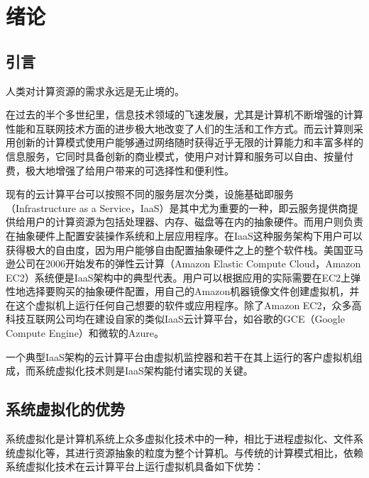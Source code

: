 
\chapter{绪论}
\label{chap:what}

\section{引言}

人类对计算资源的需求永远是无止境的。

在过去的半个多世纪里，信息技术领域的飞速发展，尤其是计算机不断增强的计算性能和互联网技术方面的进步极大地改变了人们的生活和工作方式。而云计算则采用创新的计算模式使用户能够通过网络随时获得近乎无限的计算能力和丰富多样的信息服务，它同时具备创新的商业模式，使用户对计算和服务可以自由、按量付费，极大地增强了给用户带来的可选择性和便利性。

现有的云计算平台可以按照不同的服务层次分类，设施基础即服务（Infrastructure as a Service，IaaS）是其中尤为重要的一种，即云服务提供商提供给用户的计算资源为包括处理器、内存、磁盘等在内的抽象硬件。而用户则负责在抽象硬件上配置安装操作系统和上层应用程序。在IaaS这种服务架构下用户可以获得极大的自由度，因为用户能够自由配置抽象硬件之上的整个软件栈。美国亚马逊公司在2006开始发布的弹性云计算（Amazon Elastic Compute Cloud，Amazon EC2）系统便是IaaS架构中的典型代表。用户可以根据应用的实际需要在EC2上弹性地选择要购买的抽象硬件配置，用自己的Amazon机器镜像文件创建虚拟机，并在这个虚拟机上运行任何自己想要的软件或应用程序。除了Amazon EC2，众多高科技互联网公司均在建设自家的类似IaaS云计算平台，如谷歌的GCE（Google Compute Engine）和微软的Azure。

一个典型IaaS架构的云计算平台由虚拟机监控器和若干在其上运行的客户虚拟机组成，而系统虚拟化技术则是IaaS架构能付诸实现的关键。

\section{系统虚拟化的优势}

系统虚拟化是计算机系统上众多虚拟化技术中的一种，相比于进程虚拟化、文件系统虚拟化等，其进行资源抽象的粒度为整个计算机。与传统的计算模式相比，依赖系统虚拟化技术在云计算平台上运行虚拟机具备如下优势：

